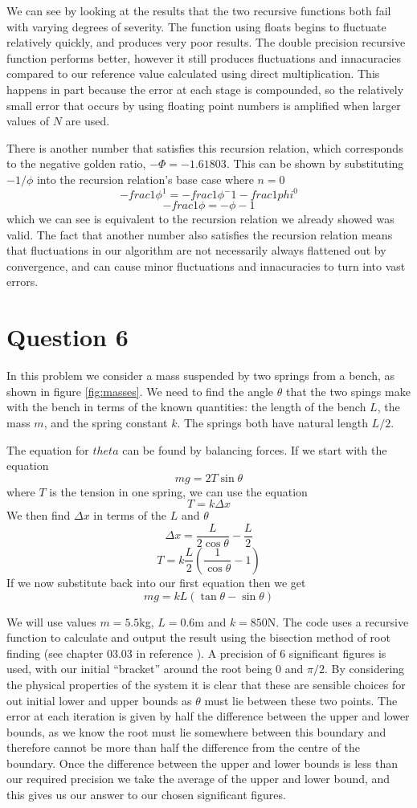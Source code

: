 \documentclass[a4paper,12pt]{UoBnote}
\begin{document}
We can see by looking at the results that the two recursive functions both fail with varying degrees of severity. The function using floats begins to fluctuate relatively quickly, and produces very poor results. The double precision recursive function performs better, however it still produces fluctuations and innacuracies compared to our reference value calculated using direct multiplication. This happens in part because the error at each stage is compounded, so the relatively small error that occurs by using floating point numbers is amplified when larger values of $N$ are used.

There is another number that satisfies this recursion relation, which corresponds to the negative golden ratio, $-\Phi=-1.61803$. This can be shown by substituting $-1/\phi$ into the recursion relation's base case where $n=0$ \[-frac{1}{\phi}^1=-frac{1}{\phi}^-1-frac{1}{phi}^0\] \[-frac{1}{\phi}=-\phi-1\] which we can see is equivalent to the recursion relation we already showed was valid. The fact that another number also satisfies the recursion relation means that fluctuations in our algorithm are not necessarily always flattened out by convergence, and can cause minor fluctuations and innacuracies to turn into vast errors.

\section{Question 6}

In this problem we consider a mass suspended by two springs from a bench, as shown in figure \ref{fig:masses}. We need to find the angle $\theta$ that the two spings make with the bench in terms of the known quantities: the length of the bench $L$, the mass $m$, and the spring constant $k$. The springs both have natural length $L/2$.

The equation for $theta$ can be found by balancing forces. If we start with the equation \[mg=2T\sin{\theta}\] where $T$ is the tension in one spring, we can use the equation \[T=k\Delta x\] We then find $\Delta x$ in terms of the $L$ and $\theta$ \[\Delta x=\frac{L}{2\cos{\theta}}-\frac{L}{2}\] \[T=k\frac{L}{2}(\frac{1}{\cos{\theta}}-1)\] If we now substitute back into our first equation then we get \[mg=kL(\tan{\theta}-\sin{\theta})\]

We will use values $m=5.5$kg, $L=0.6$m and $k=850$N. The code uses a recursive function to calculate and output the result using the bisection method of root finding (see chapter 03.03 in reference \cite{holistic}). A precision of 6 significant figures is used, with our initial ``bracket'' around the root being $0$ and $\pi/2$. By considering the physical properties of the system it is clear that these are sensible choices for out initial lower and upper bounds as $\theta$ must lie between these two points. The error at each iteration is given by half the difference between the upper and lower bounds, as we know the root must lie somewhere between this boundary and therefore cannot be more than half the difference from the centre of the boundary. Once the difference between the upper and lower bounds is less than our required precision we take the average of the upper and lower bound, and this gives us our answer to our chosen significant figures. 
\end{document}

